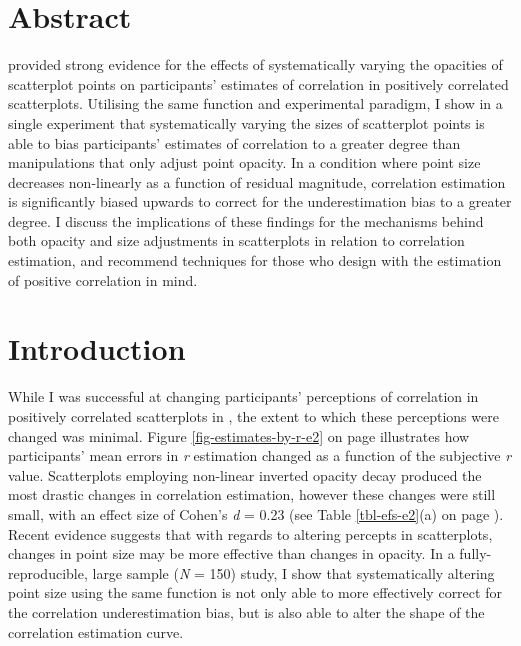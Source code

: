 \documentclass[../main.tex]{subfiles}
\begin{document}
\section{Abstract}\label{abstract-adjusting-size}

 provided strong evidence for the effects
of systematically varying the opacities of scatterplot points on
participants' estimates of correlation in positively correlated
scatterplots. Utilising the same function and experimental paradigm, I
show in a single experiment that systematically varying the sizes of
scatterplot points is able to bias participants' estimates of
correlation to a greater degree than manipulations that only adjust
point opacity. In a condition where point size decreases non-linearly as
a function of residual magnitude, correlation estimation is
significantly biased upwards to correct for the underestimation bias to
a greater degree. I discuss the implications of these findings for the
mechanisms behind both opacity and size adjustments in scatterplots in
relation to correlation estimation, and recommend techniques for those
who design with the estimation of positive correlation in mind.

\section{Introduction}\label{introduction-adjusting-size}

While I was successful at changing participants' perceptions of
correlation in positively correlated scatterplots in
, the extent to which these perceptions
were changed was minimal. Figure \ref{fig-estimates-by-r-e2} on page
\pageref{fig-estimates-by-r-e2} illustrates how participants' mean
errors in \emph{r} estimation changed as a function of the subjective
\emph{r} value. Scatterplots employing non-linear inverted opacity decay
produced the most drastic changes in correlation estimation, however
these changes were still small, with an effect size of Cohen's \emph{d}
= 0.23 (see Table \ref{tbl-efs-e2}(a) on page \pageref{tbl-efs-e2}).
Recent evidence suggests that with regards to altering percepts in
scatterplots, changes in point size may be more effective than changes
in opacity. In a fully-reproducible, large sample (\emph{N} = 150)
study, I show that systematically altering point size using the same
function is not only able to more effectively correct for the
correlation underestimation bias, but is also able to alter the shape of
the correlation estimation curve.
\end{document}
